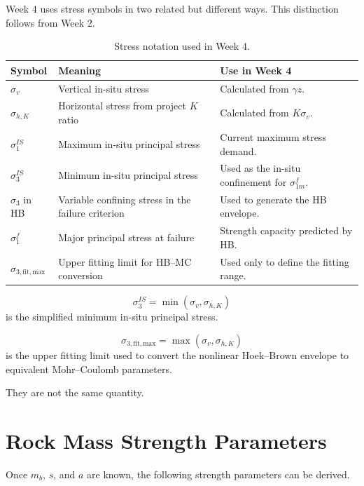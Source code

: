 \documentclass[a4paper,12pt]{article}
\begin{document}
Week 4 uses stress symbols in two related but different ways. This distinction follows
from Week 2.

\begin{table}[H]
\centering
\small
\begin{tabularx}{\textwidth}{l l Y}
\toprule
\textbf{Symbol} & \textbf{Meaning} & \textbf{Use in Week 4} \\
\midrule
\(\sigma_v\) & Vertical in-situ stress & Calculated from \(\gamma z\). \\
\(\sigma_{h,K}\) & Horizontal stress from project \(K\) ratio & Calculated from \(K\sigma_v\). \\
\(\sigma_1^{IS}\) & Maximum in-situ principal stress & Current maximum stress demand. \\
\(\sigma_3^{IS}\) & Minimum in-situ principal stress & Used as the in-situ confinement for \(\sigma_{1m}^f\). \\
\(\sigma_3\) in HB & Variable confining stress in the failure criterion & Used to generate the HB envelope. \\
\(\sigma_1^f\) & Major principal stress at failure & Strength capacity predicted by HB. \\
\(\sigma_{3,\mathrm{fit,max}}\) & Upper fitting limit for HB--MC conversion & Used only to define the fitting range. \\
\bottomrule
\end{tabularx}
\caption{Stress notation used in Week 4.}
\label{tab:stress_notation}
\end{table}

\begin{keybox}
\[
\sigma_3^{IS}=\min(\sigma_v,\sigma_{h,K})
\]
is the simplified minimum in-situ principal stress.

\[
\sigma_{3,\mathrm{fit,max}}=\max(\sigma_v,\sigma_{h,K})
\]
is the upper fitting limit used to convert the nonlinear Hoek--Brown envelope to
equivalent Mohr--Coulomb parameters.

They are not the same quantity.
\end{keybox}

\section{Rock Mass Strength Parameters}

Once \(m_b\), \(s\), and \(a\) are known, the following strength parameters can be derived.
\end{document}
